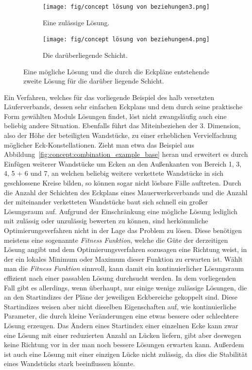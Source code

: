 \begin{figure}[ht!]
    \centering
    \begin{subfigure}[b]{0.4\columnwidth}
      \texttt{[image: fig/concept lösung von beziehungen3.png]}
      \caption{Eine zulässige Lösung.}\label{fig:concept:loesen_von_beziehungen3}
    \end{subfigure}
    \hfil
    \begin{subfigure}[b]{0.4\columnwidth}
      \texttt{[image: fig/concept lösung von beziehungen4.png]}
      \caption{Die darüberliegende Schicht.}\label{fig:concept:loesen_von_beziehungen4}
    \end{subfigure}
  \caption{Eine mögliche Lösung und die durch die Eckpläne entstehende zweite Lösung für die darüber liegende Schicht.}\label{fig:concept:loesen_von_beziehungen3und4}
\end{figure}

Ein Verfahren, welches für das vorliegende Beispiel des halb versetzten Läuferverbands, dessen sehr einfachen Eckplans und dem durch seine praktische Form gewählten Moduls Lösungen findet, löst nicht zwangsläufig auch eine beliebig andere Situation.
Ebenfalls führt das Miteinbeziehen der 3. Dimension, also der Höhe der beteiligten Wandstücke, zu einer erheblichen Vervielfachung möglicher Eck-Konstellationen.
Zieht man etwa das Beispiel aus Abbildung~\ref{fig:concept:combination_example_base} heran und erweitert es durch Einfügen weiterer Wandstücke um Ecken an den Außenkanten von Bereich 1, 3, 4, 5 + 6 und 7, an welchen beliebig weitere verkettete Wandstücke in sich geschlossene Kreise bilden, so können sogar nicht lösbare Fälle auftreten.
Durch die Anzahl der Schichten des Eckplans eines Mauerwerksverbands und die Anzahl der miteinander verketteten Wandstücke baut sich schnell ein großer Lösungsraum auf.
Aufgrund der Einschränkung eine mögliche Lösung lediglich mit zulässig oder unzulässig bewerten zu können, sind herkömmliche Optimierungsverfahren nicht in der Lage das Problem zu lösen.
Diese benötigen meistens eine sogenannte \textit{Fitness Funktion}, welche die Güte der derzeitigen Lösung angibt und dem Optimierungsverfahren sozusagen eine Richtung weist, in der ein lokales Minimum oder Maximum dieser Funktion zu erwarten ist.
Wählt man die \textit{Fitness Funktion} sinnvoll, kann damit ein kontinuierlicher Lösungsraum effizient nach einer passablen Lösung durchsucht werden.
In dem vorliegenden Fall gibt es allerdings, wenn überhaupt, nur einige wenige zulässige Lösungen, die an den Startindizes der Pläne der jeweiligen Eckbereiche gekoppelt sind.
Diese Startindizes weisen aber nicht dieselben Eigenschaften auf, wie kontinuierliche Parameter, die durch kleine Veränderungen eine etwas bessere oder schlechtere Lösung erzeugen.
Das Ändern eines Startindex einer einzelnen Ecke kann zwar eine Lösung mit einer reduzierten Anzahl an Lücken liefern, gibt aber deswegen keine Richtung vor in der man noch bessere Lösungen erwarten kann.
Außerdem ist auch eine Lösung mit einer einzigen Lücke nicht zulässig, da dies die Stabilität eines Wandstücks stark beeinflussen könnte.

